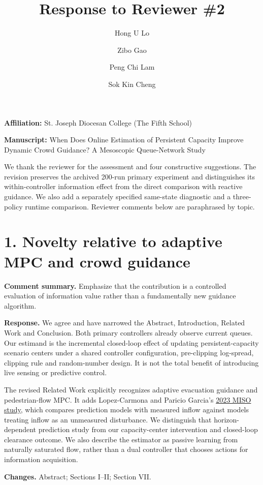 \documentclass[11pt]{article}
\title{Response to Reviewer \#2}
\author{Hong U Lo \and Zibo Gao \and Peng Chi Lam \and Sok Kin Cheng}
\date{}
\begin{document}
\maketitle
\noindent\textbf{Affiliation:} St. Joseph Diocesan College (The Fifth School)\par\medskip
\noindent\textbf{Manuscript:} When Does Online Estimation of Persistent Capacity Improve Dynamic Crowd Guidance? A Mesoscopic Queue-Network Study

\medskip
\noindent We thank the reviewer for the assessment and four constructive suggestions. The revision preserves the archived 200-run primary experiment and distinguishes its within-controller information effect from the direct comparison with reactive guidance. We also add a separately specified same-state diagnostic and a three-policy runtime comparison. Reviewer comments below are paraphrased by topic.

\section*{1. Novelty relative to adaptive MPC and crowd guidance}
\textbf{Comment summary.} Emphasize that the contribution is a controlled evaluation of information value rather than a fundamentally new guidance algorithm.

\textbf{Response.} We agree and have narrowed the Abstract, Introduction, Related Work and Conclusion. Both primary controllers already observe current queues. Our estimand is the incremental closed-loop effect of updating persistent-capacity scenario centers under a shared controller configuration, pre-clipping log-spread, clipping rule and random-number design. It is not the total benefit of introducing live sensing or predictive control.

The revised Related Work explicitly recognizes adaptive evacuation guidance and pedestrian-flow MPC. It adds Lopez-Carmona and Paricio Garcia's \href{https://doi.org/10.1016/j.trc.2023.104268}{2023 MISO study}, which compares prediction models with measured inflow against models treating inflow as an unmeasured disturbance. We distinguish that horizon-dependent prediction study from our capacity-center intervention and closed-loop clearance outcome. We also describe the estimator as passive learning from naturally saturated flow, rather than a dual controller that chooses actions for information acquisition.

\textbf{Changes.} Abstract; Sections I--II; Section VII.
\end{document}
